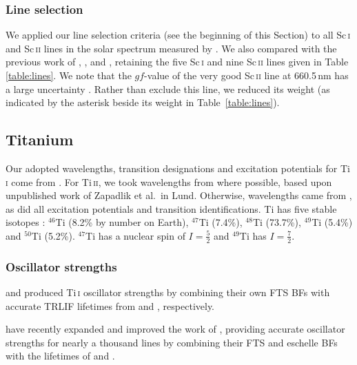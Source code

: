 \documentclass[traditabstract]{aa}
\begin{document}
\subsubsection{Line selection}
\label{Sclineselection}

We applied our line selection criteria (see the beginning of this Section) to all Sc\,\textsc{i} and Sc\,\textsc{ii} lines in the solar spectrum measured by \citet{Lawler89}.  We also compared with the previous work of \citet{Biemont74a}, \citet{Neuforge93}, \citet{Youssef89} and \citet{Reddy03}, retaining the five Sc\,\textsc{i} and nine Sc\,\textsc{ii} lines given in Table \ref{table:lines}.  We note that the $gf$-value of the very good Sc\,\textsc{ii} line at 660.5\,nm has a large uncertainty \citep[$>$$40$\%;][]{Lawler89}.  Rather than exclude this line, we reduced its weight (as indicated by the asterisk beside its weight in Table~\ref{table:lines}).


\subsection{Titanium}
\label{Tiatomicdata}

Our adopted wavelengths, transition designations and excitation potentials for Ti\,\textsc{i} come from \citet{Forsberg91}.
For Ti\,\textsc{ii}, we took wavelengths from \citet[][with erratum: \citealt{Pickering02}]{Pickering01} where
possible, based upon unpublished work of Zapadlik et al.~in Lund.  Otherwise, wavelengths came from \citet{Huldt82},
as did all excitation potentials and transition identifications.  Ti has five stable isotopes \citep{IUPAC98}:
$^{46}$Ti (8.2\% by number on Earth), $^{47}$Ti (7.4\%), $^{48}$Ti (73.7\%), $^{49}$Ti (5.4\%) and $^{50}$Ti (5.2\%).  $^{47}$Ti
has a nuclear spin of $I=\frac{5}{2}$ and $^{49}$Ti has $I=\frac{7}{2}$.

\subsubsection{Oscillator strengths}
\label{Tigfs}

\citet{Nitz98} and \citet{BW06} produced Ti\,\textsc{i} oscillator strengths by combining their own FTS BFs with
accurate TRLIF lifetimes from \citet{Salih90} and \citet{Lawler91}, respectively. 

\citet{Lawler13} have recently expanded and improved the work of \citet{Nitz98}, providing accurate oscillator strengths for nearly a thousand lines by combining their FTS and eschelle BFs with the lifetimes of \citet{Salih90} and \citet{Lawler91}.
\end{document}
